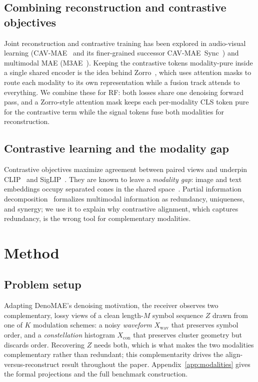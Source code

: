 \documentclass[conference]{IEEEtran}
\begin{document}
\subsection{Combining reconstruction and contrastive objectives}
Joint reconstruction and contrastive training has been explored in audio-visual
learning (CAV-MAE~\cite{cavmae} and its finer-grained successor
CAV-MAE~Sync~\cite{cavmaesync}) and multimodal MAE (M3AE~\cite{m3ae}). Keeping the
contrastive tokens modality-pure inside a single shared encoder is the idea behind
Zorro~\cite{zorro}, which uses attention masks to route each modality to its own
representation while a fusion track attends to everything. We combine these for RF:
both losses share one denoising forward pass, and a Zorro-style attention mask keeps
each per-modality CLS token pure for the contrastive term while the signal tokens
fuse both modalities for reconstruction.

\subsection{Contrastive learning and the modality gap}
Contrastive objectives maximize agreement between paired views and underpin
CLIP~\cite{clip} and SigLIP~\cite{siglip}. They are known to leave a
\emph{modality gap}: image and text embeddings occupy separated cones in the
shared space~\cite{modgap}. Partial information decomposition~\cite{bertschinger,pid}
formalizes multimodal information as redundancy, uniqueness, and synergy; we use
it to explain why contrastive alignment, which captures redundancy, is the wrong
tool for complementary modalities.

\section{Method}
\subsection{Problem setup}
Adapting DenoMAE's denoising motivation, the receiver observes two complementary,
lossy views of a clean length-$M$ symbol sequence $Z$ drawn from one of $K$ modulation schemes: a noisy
\emph{waveform} $X_{\text{wav}}$ that preserves symbol order, and a
\emph{constellation} histogram $X_{\text{con}}$ that preserves cluster geometry but
discards order. Recovering $Z$ needs both, which is what makes the two modalities
complementary rather than redundant; this complementarity drives the
align-versus-reconstruct result throughout the paper. Appendix~\ref{app:modalities}
gives the formal projections and the full benchmark construction.
\end{document}
